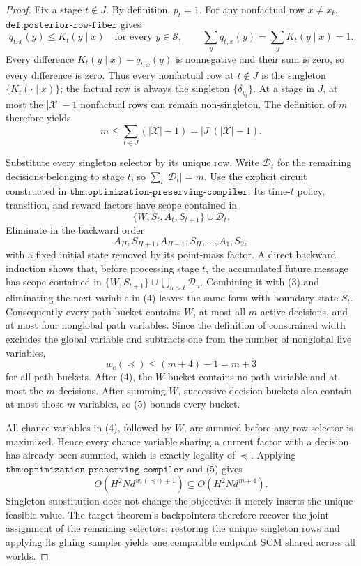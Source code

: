 \documentclass{article}
\begin{document}
\begin{proof}
Fix a stage \(t\notin J\).  By definition, \(p_t=1\).  For any nonfactual row \(x\ne x_t\), \(\texttt{def:posterior-row-fiber}\) gives
\[
 q_{t,x}(y)\le K_t(y\mid x)\quad\text{for every }y\in\mathcal S,
 \qquad
 \sum_yq_{t,x}(y)=\sum_yK_t(y\mid x)=1.
 \tag{1}
\]
Every difference \(K_t(y\mid x)-q_{t,x}(y)\) is nonnegative and their sum is zero, so every difference is zero.  Thus every nonfactual row at \(t\notin J\) is the singleton \(\{K_t(\cdot\mid x)\}\); the factual row is always the singleton \(\{\delta_{y_t}\}\).  At a stage in \(J\), at most the \(|\mathcal X|-1\) nonfactual rows can remain non-singleton.  The definition of \(m\) therefore yields
\[
 m\le\sum_{t\in J}(|\mathcal X|-1)=|J|(|\mathcal X|-1).
 \tag{2}
\]

Substitute every singleton selector by its unique row.  Write \(\mathcal D_t\) for the remaining decisions belonging to stage \(t\), so \(\sum_t|\mathcal D_t|=m\).  Use the explicit circuit constructed in \(\texttt{thm:optimization-preserving-compiler}\).  Its time-\(t\) policy, transition, and reward factors have scope contained in
\[
 \{W,S_t,A_t,S_{t+1}\}\cup\mathcal D_t.
 \tag{3}
\]
Eliminate in the backward order
\[
 A_H,S_{H+1},A_{H-1},S_H,\ldots,A_1,S_2,
 \tag{4}
\]
with a fixed initial state removed by its point-mass factor.  A direct backward induction shows that, before processing stage \(t\), the accumulated future message has scope contained in \(\{W,S_{t+1}\}\cup\bigcup_{u>t}\mathcal D_u\).  Combining it with (3) and eliminating the next variable in (4) leaves the same form with boundary state \(S_t\).  Consequently every path bucket contains \(W\), at most all \(m\) active decisions, and at most four nonglobal path variables.  Since the definition of constrained width excludes the global variable and subtracts one from the number of nonglobal live variables,
\[
 w_{\mathrm c}(\preceq)\le (m+4)-1=m+3
 \tag{5}
\]
for all path buckets.  After (4), the \(W\)-bucket contains no path variable and at most the \(m\) decisions.  After summing \(W\), successive decision buckets also contain at most those \(m\) variables, so (5) bounds every bucket.

All chance variables in (4), followed by \(W\), are summed before any row selector is maximized.  Hence every chance variable sharing a current factor with a decision has already been summed, which is exactly legality of \(\preceq\).  Applying \(\texttt{thm:optimization-preserving-compiler}\) and (5) gives
\[
 O\!\left(H^2N d^{w_{\mathrm c}(\preceq)+1}\right)
 \subseteq O\!\left(H^2N d^{m+4}\right).
 \tag{6}
\]
Singleton substitution does not change the objective: it merely inserts the unique feasible value.  The target theorem's backpointers therefore recover the joint assignment of the remaining selectors; restoring the unique singleton rows and applying its gluing sampler yields one compatible endpoint SCM shared across all worlds.


\end{proof}
\end{document}
